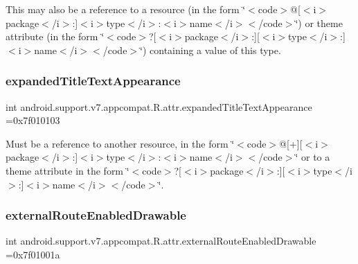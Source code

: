 This may also be a reference to a resource (in the form \char`\"{}$<$code$>$@\mbox{[}$<$i$>$package$<$/i$>$\+:\mbox{]}$<$i$>$type$<$/i$>$\+:$<$i$>$name$<$/i$>$$<$/code$>$\char`\"{}) or theme attribute (in the form \char`\"{}$<$code$>$?\mbox{[}$<$i$>$package$<$/i$>$\+:\mbox{]}\mbox{[}$<$i$>$type$<$/i$>$\+:\mbox{]}$<$i$>$name$<$/i$>$$<$/code$>$\char`\"{}) containing a value of this type. \mbox{\label{classandroid_1_1support_1_1v7_1_1appcompat_1_1R_1_1attr_a6591a675d361c68a12e36dd6fcd3e05b}} 
\subsubsection{\texorpdfstring{expanded\+Title\+Text\+Appearance}{expandedTitleTextAppearance}}
{\footnotesize\ttfamily int android.\+support.\+v7.\+appcompat.\+R.\+attr.\+expanded\+Title\+Text\+Appearance =0x7f010103\hspace{0.3cm}{\ttfamily [static]}}

Must be a reference to another resource, in the form \char`\"{}$<$code$>$@\mbox{[}+\mbox{]}\mbox{[}$<$i$>$package$<$/i$>$\+:\mbox{]}$<$i$>$type$<$/i$>$\+:$<$i$>$name$<$/i$>$$<$/code$>$\char`\"{} or to a theme attribute in the form \char`\"{}$<$code$>$?\mbox{[}$<$i$>$package$<$/i$>$\+:\mbox{]}\mbox{[}$<$i$>$type$<$/i$>$\+:\mbox{]}$<$i$>$name$<$/i$>$$<$/code$>$\char`\"{}. \mbox{\label{classandroid_1_1support_1_1v7_1_1appcompat_1_1R_1_1attr_a413c20085b4ef8fcd95a38eb99a4f30d}} 
\subsubsection{\texorpdfstring{external\+Route\+Enabled\+Drawable}{externalRouteEnabledDrawable}}
{\footnotesize\ttfamily int android.\+support.\+v7.\+appcompat.\+R.\+attr.\+external\+Route\+Enabled\+Drawable =0x7f01001a\hspace{0.3cm}{\ttfamily [static]}}

